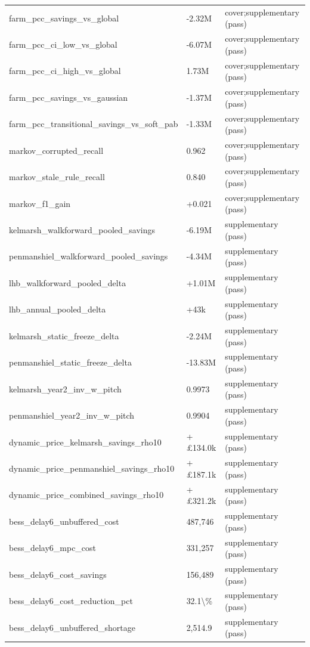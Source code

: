 \begin{table}[H]
\begin{tabular}{lll}
farm\_pcc\_savings\_vs\_global & -2.32M & cover;supplementary (pass) \\
farm\_pcc\_ci\_low\_vs\_global & -6.07M & cover;supplementary (pass) \\
farm\_pcc\_ci\_high\_vs\_global & 1.73M & cover;supplementary (pass) \\
farm\_pcc\_savings\_vs\_gaussian & -1.37M & cover;supplementary (pass) \\
farm\_pcc\_transitional\_savings\_vs\_soft\_pab & -1.33M & cover;supplementary (pass) \\
markov\_corrupted\_recall & 0.962 & cover;supplementary (pass) \\
markov\_stale\_rule\_recall & 0.840 & cover;supplementary (pass) \\
markov\_f1\_gain & +0.021 & cover;supplementary (pass) \\
kelmarsh\_walkforward\_pooled\_savings & -6.19M & supplementary (pass) \\
penmanshiel\_walkforward\_pooled\_savings & -4.34M & supplementary (pass) \\
lhb\_walkforward\_pooled\_delta & +1.01M & supplementary (pass) \\
lhb\_annual\_pooled\_delta & +43k & supplementary (pass) \\
kelmarsh\_static\_freeze\_delta & -2.24M & supplementary (pass) \\
penmanshiel\_static\_freeze\_delta & -13.83M & supplementary (pass) \\
kelmarsh\_year2\_inv\_w\_pitch & 0.9973 & supplementary (pass) \\
penmanshiel\_year2\_inv\_w\_pitch & 0.9904 & supplementary (pass) \\
dynamic\_price\_kelmarsh\_savings\_rho10 & +£134.0k & supplementary (pass) \\
dynamic\_price\_penmanshiel\_savings\_rho10 & +£187.1k & supplementary (pass) \\
dynamic\_price\_combined\_savings\_rho10 & +£321.2k & supplementary (pass) \\
bess\_delay6\_unbuffered\_cost & 487,746 & supplementary (pass) \\
bess\_delay6\_mpc\_cost & 331,257 & supplementary (pass) \\
bess\_delay6\_cost\_savings & 156,489 & supplementary (pass) \\
bess\_delay6\_cost\_reduction\_pct & 32.1\textbackslash{}\% & supplementary (pass) \\
bess\_delay6\_unbuffered\_shortage & 2,514.9 & supplementary (pass) \\

\end{tabular}
\end{table}
